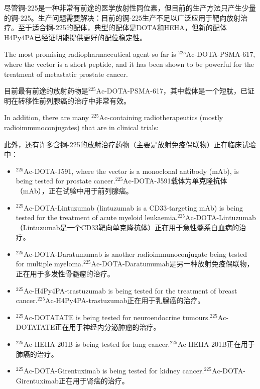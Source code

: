 \documentclass[dvipsnames, svgnames,a4paper,11pt]{article}
\begin{document}
尽管锕-225是一种非常有前途的医学放射性同位素，但目前的生产方法只产生少量的锕-225。生产问题需要解决：目前的锕-225生产不足以广泛应用于靶向放射治疗。至于适合锕-225的配体，典型的配体是DOTA和HEHA，但新的配体H4Py4PA已经证明能提供更好的配位稳定性。

The most promising radiopharmaceutical agent so far is \(\mathrm{^{225}Ac}\)-DOTA-PSMA-617, where the vector is a short peptide, and it has been shown to be powerful for the treatment of metastatic prostate cancer.

目前最有前途的放射药物是\(\mathrm{^{225}Ac}\)-DOTA-PSMA-617，其中载体是一个短肽，已证明在转移性前列腺癌的治疗中非常有效。

In addition, there are many \(\mathrm{^{225}Ac}\)-containing radiotherapeutics (mostly radioimmunoconjugates) that are in clinical trials:

此外，还有许多含锕-225的放射治疗药物（主要是放射免疫偶联物）正在临床试验中：
\begin{itemize}
  \item \(\mathrm{^{225}Ac}\)-DOTA-J591, where the vector is a monoclonal antibody (mAb), is being tested for prostate cancer.\(\mathrm{^{225}Ac}\)-DOTA-J591载体为单克隆抗体（mAb），正在试验中用于前列腺癌。
  \item \(\mathrm{^{225}Ac}\)-DOTA-Lintuzumab (lintuzumab is a CD33-targeting mAb) is being tested for the treatment of acute myeloid leukaemia.\(\mathrm{^{225}Ac}\)-DOTA-Lintuzumab（Lintuzumab是一个CD33靶向单克隆抗体）正在用于急性髓系白血病的治疗。
  \item \(\mathrm{^{225}Ac}\)-DOTA-Daratumumab is another radioimmunoconjugate being tested for multiple myeloma.\(\mathrm{^{225}Ac}\)-DOTA-Daratumumab是另一种放射免疫偶联物，正在用于多发性骨髓瘤的治疗。
  \item \(\mathrm{^{225}Ac}\)-H4Py4PA-trastuzumab is being tested for the treatment of breast cancer.\(\mathrm{^{225}Ac}\)-H4Py4PA-trastuzumab正在用于乳腺癌的治疗。
  \item \(\mathrm{^{225}Ac}\)-DOTATATE is being tested for neuroendocrine tumours.\(\mathrm{^{225}Ac}\)-DOTATATE正在用于神经内分泌肿瘤的治疗。
  \item \(\mathrm{^{225}Ac}\)-HEHA-201B is being tested for lung cancer.\(\mathrm{^{225}Ac}\)-HEHA-201B正在用于肺癌的治疗。
  \item \(\mathrm{^{225}Ac}\)-DOTA-Girentuximab is being tested for kidney cancer.\(\mathrm{^{225}Ac}\)-DOTA-Girentuximab正在用于肾癌的治疗。
\end{itemize}
\end{document}
